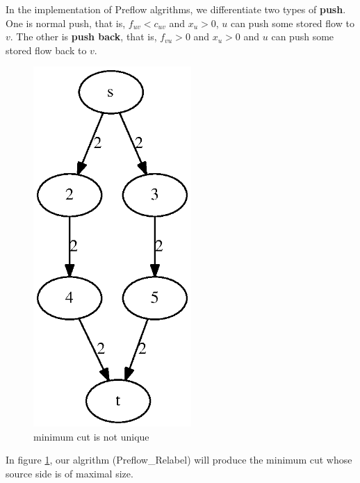 \documentclass{article}
\begin{document}
In the implementation of Preflow algrithms, we differentiate
two types of \textbf{push}. One is normal push, that is,
$f_{uv} < c_{uv}$ and $x_u >0$, $u$ can push some stored flow
to $v$. The other is \textbf{push back}, that is,
$f_{vu} >0$ and $x_u >0$ and $u$ can push some stored flow back to $v$.

\begin{figure}[!ht]
\centering
\includegraphics[width=6cm]{fig/size.eps}
\caption{minimum cut is not unique}\label{fig:mc}
\end{figure}

In figure \ref{fig:mc}, our algrithm (Preflow_Relabel) will produce the minimum cut whose source side is of maximal size.
\end{document}

